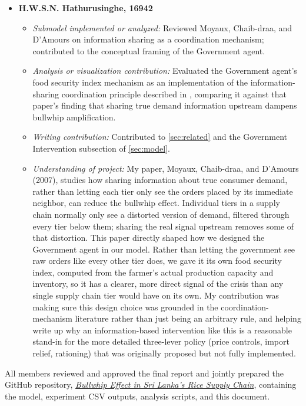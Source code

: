 \documentclass[final,onefignum,onetabnum]{siuro250211}
\begin{document}
\begin{itemize}[leftmargin=.3in]
\item[] \textbf{H.W.S.N. Hathurusinghe, 16942}
\begin{itemize}
\item \textit{Submodel implemented or analyzed:} Reviewed Moyaux, Chaib-draa, and D'Amours
\cite{MoyauxChaibdraaDamours2007} on information sharing as a coordination mechanism; contributed
to the conceptual framing of the Government agent.
\item \textit{Analysis or visualization contribution:} Evaluated the Government agent's food
security index mechanism as an implementation of the information-sharing coordination principle
described in \cite{MoyauxChaibdraaDamours2007}, comparing it against that paper's finding that
sharing true demand information upstream dampens bullwhip amplification.
\item \textit{Writing contribution:} Contributed to \cref{sec:related} and the Government
Intervention subsection of \cref{sec:model}.
\item \textit{Understanding of project:} My paper, Moyaux, Chaib-draa, and D'Amours (2007), studies
how sharing information about true consumer demand, rather than letting each tier only see the
orders placed by its immediate neighbor, can reduce the bullwhip effect. Individual tiers in a
supply chain normally only see a distorted version of demand, filtered through every tier below
them; sharing the real signal upstream removes some of that distortion. This paper directly shaped
how we designed the Government agent in our model. Rather than letting the government see raw
orders like every other tier does, we gave it its own food security index, computed from the
farmer's actual production capacity and inventory, so it has a clearer, more direct signal of the
crisis than any single supply chain tier would have on its own. My contribution was making sure
this design choice was grounded in the coordination-mechanism literature rather than just being an
arbitrary rule, and helping write up why an information-based intervention like this is a
reasonable stand-in for the more detailed three-lever policy (price controls, import relief,
rationing) that was originally proposed but not fully implemented.
\end{itemize}

\end{itemize}

All members reviewed and approved the final report and jointly prepared the GitHub repository,
\href{https://github.com/sara316129/srilanka-rice-supply-chain-bullwhip}{\textit{Bullwhip Effect
in Sri Lanka's Rice Supply Chain}}, containing the model, experiment CSV outputs, analysis
scripts, and this document.
\end{document}

